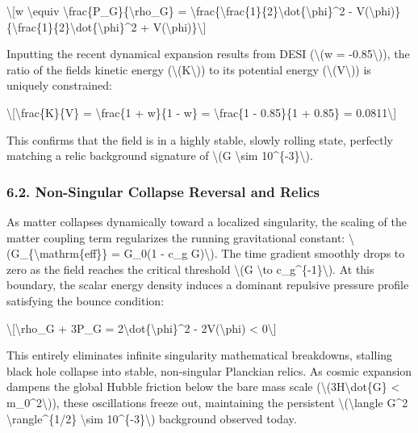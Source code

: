 \documentclass[
  10pt,
]{article}
\begin{document}
\textbackslash{[}w \textbackslash equiv
\textbackslash frac\{P\_G\}\{\textbackslash rho\_G\} =
\textbackslash frac\{\textbackslash frac\{1\}\{2\}\textbackslash dot\{\textbackslash phi\}\^{}2
-
V(\textbackslash phi)\}\{\textbackslash frac\{1\}\{2\}\textbackslash dot\{\textbackslash phi\}\^{}2
+ V(\textbackslash phi)\}\textbackslash{]}

Inputting the recent dynamical expansion results from DESI
(\textbackslash(w = -0.85\textbackslash)), the ratio of the
field\textquotesingle s kinetic energy (\textbackslash(K\textbackslash))
to its potential energy (\textbackslash(V\textbackslash)) is uniquely
constrained:

\textbackslash{[}\textbackslash frac\{K\}\{V\} = \textbackslash frac\{1
+ w\}\{1 - w\} = \textbackslash frac\{1 - 0.85\}\{1 + 0.85\} =
0.0811\textbackslash{]}

This confirms that the field is in a highly stable, slowly rolling
state, perfectly matching a relic background signature of
\textbackslash(G \textbackslash sim 10\^{}\{-3\}\textbackslash).

\hypertarget{non-singular-collapse-reversal-and-relics}{%
\subsubsection{6.2. Non-Singular Collapse Reversal and
Relics}\label{non-singular-collapse-reversal-and-relics}}

As matter collapses dynamically toward a localized singularity, the
scaling of the matter coupling term regularizes the running
gravitational constant:
\textbackslash(G\_\{\textbackslash mathrm\{eff\}\} = G\_0(1 - c\_g
G)\textbackslash). The time gradient smoothly drops to zero as the field
reaches the critical threshold \textbackslash(G \textbackslash to
c\_g\^{}\{-1\}\textbackslash). At this boundary, the scalar energy
density induces a dominant repulsive pressure profile satisfying the
bounce condition:

\textbackslash{[}\textbackslash rho\_G + 3P\_G =
2\textbackslash dot\{\textbackslash phi\}\^{}2 - 2V(\textbackslash phi)
\textless{} 0\textbackslash{]}

This entirely eliminates infinite singularity mathematical breakdowns,
stalling black hole collapse into stable, non-singular Planckian relics.
As cosmic expansion dampens the global Hubble friction below the bare
mass scale (\textbackslash(3H\textbackslash dot\{G\} \textless{}
m\_0\^{}2\textbackslash)), these oscillations freeze out, maintaining
the persistent \textbackslash(\textbackslash langle G\^{}2
\textbackslash rangle\^{}\{1/2\} \textbackslash sim
10\^{}\{-3\}\textbackslash) background observed today.
\end{document}
